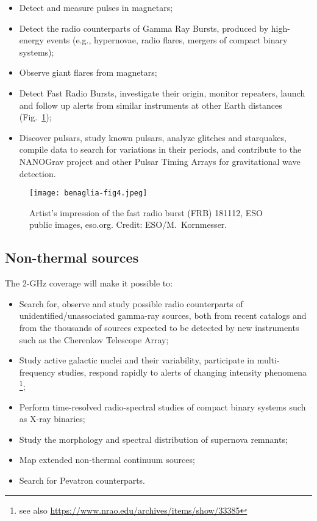 \documentclass[baaa]{baaa}
\begin{document}
\begin{itemize}
\item Detect and measure pulses in magnetars;
\item Detect the radio counterparts of Gamma Ray Bursts, produced by high-energy events (e.g., hypernovae, radio flares, mergers of compact binary systems);
\item Observe giant flares from magnetars;
\item Detect Fast Radio Bursts, investigate their origin, monitor repeaters, launch and follow up alerts from similar instruments at other Earth distances (Fig.~\ref{fig:frb181112});
\item Discover pulsars, study known pulsars, analyze glitches and starquakes, compile data to search for variations in their periods, and contribute to the NANOGrav project and other Pulsar Timing Arrays for gravitational wave detection.
\end{itemize}

\begin{figure}[!h]
\centering
\texttt{[image: benaglia-fig4.jpeg]}
\caption{Artist's impression of the fast radio burst (FRB) 181112, ESO public images, eso.org. Credit: ESO/M.~Kornmesser.}
\label{fig:frb181112}
\end{figure}


\subsection{Non-thermal sources}

The 2-GHz coverage will make it possible to: 

\begin{itemize}
\item Search for, observe and study possible radio counterparts of unidentified/unassociated gamma-ray sources, both from recent catalogs and from the thousands of sources expected to be detected by new instruments such as the Cherenkov Telescope Array;
\item Study active galactic nuclei and their variability, participate in multi-frequency studies, respond rapidly to alerts of changing intensity phenomena \citep[e.g., the radio galaxy Cygnus A as imaged by][in their Fig.~1]{perley1984}\footnote{see also \url{https://www.nrao.edu/archives/items/show/33385}};
\item Perform time-resolved radio-spectral studies of compact binary systems such as X-ray binaries;
\item Study the morphology and spectral distribution of supernova remnants;
\item Map extended non-thermal continuum sources;
\item Search for Pevatron counterparts.
\end{itemize}
\end{document}
